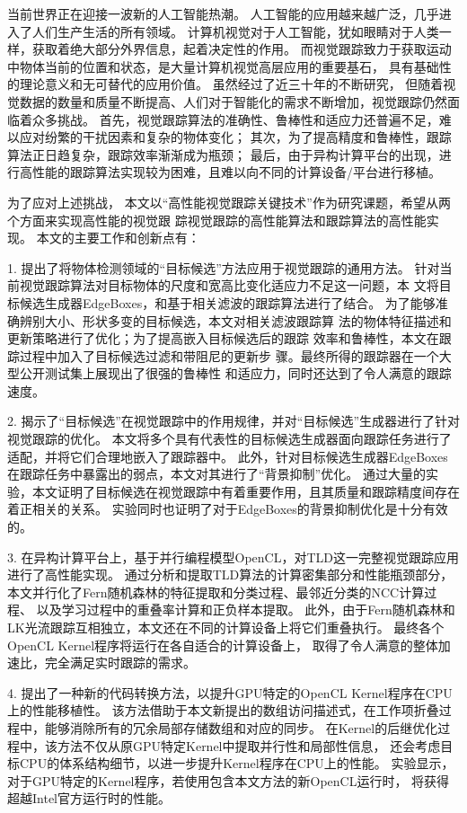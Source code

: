 \begin{cabstract}
当前世界正在迎接一波新的人工智能热潮。
人工智能的应用越来越广泛，几乎进入了人们生产生活的所有领域。
计算机视觉对于人工智能，犹如眼睛对于人类一样，获取着绝大部分外界信息，起着决定性的作用。
而视觉跟踪致力于获取运动中物体当前的位置和状态，是大量计算机视觉高层应用的重要基石，
具有基础性的理论意义和无可替代的应用价值。
虽然经过了近三十年的不断研究，
但随着视觉数据的数量和质量不断提高、人们对于智能化的需求不断增加，视觉跟踪仍然面临着众多挑战。
首先，视觉跟踪算法的准确性、鲁棒性和适应力还普遍不足，难以应对纷繁的干扰因素和复杂的物体变化；
其次，为了提高精度和鲁棒性，跟踪算法正日趋复杂，跟踪效率渐渐成为瓶颈；
最后，由于异构计算平台的出现，进行高性能的跟踪算法实现较为困难，且难以向不同的计算设备/平台进行移植。

为了应对上述挑战，
本文以``高性能视觉跟踪关键技术''作为研究课题，希望从两个方面来实现高性能的视觉跟
踪\pozhehao 视觉跟踪的高性能算法和跟踪算法的高性能实现。
本文的主要工作和创新点有：

1. 提出了将物体检测领域的``目标候选''方法应用于视觉跟踪的通用方法。
针对当前视觉跟踪算法对目标物体的尺度和宽高比变化适应力不足这一问题，本
文将目标候选生成器EdgeBoxes，和基于相关滤波的跟踪算法进行了结合。
为了能够准确辨别大小、形状多变的目标候选，本文对相关滤波跟踪算
法的物体特征描述和更新策略进行了优化；为了提高嵌入目标候选后的跟踪
效率和鲁棒性，本文在跟踪过程中加入了目标候选过滤和带阻尼的更新步
骤。最终所得的跟踪器在一个大型公开测试集上展现出了很强的鲁棒性
和适应力，同时还达到了令人满意的跟踪速度。

2. 揭示了``目标候选''在视觉跟踪中的作用规律，并对``目标候选''生成器进行了针对视觉跟踪的优化。
本文将多个具有代表性的目标候选生成器面向跟踪任务进行了适配，并将它们合理地嵌入了跟踪器中。
此外，针对目标候选生成器EdgeBoxes在跟踪任务中暴露出的弱点，本文对其进行了``背景抑制''优化。
通过大量的实验，本文证明了目标候选在视觉跟踪中有着重要作用，且其质量和跟踪精度间存在着正相关的关系。
实验同时也证明了对于EdgeBoxes的背景抑制优化是十分有效的。

3. 在异构计算平台上，基于并行编程模型OpenCL，对TLD这一完整视觉跟踪应用进行了高性能实现。
通过分析和提取TLD算法的计算密集部分和性能瓶颈部分，
本文并行化了Fern随机森林的特征提取和分类过程、最邻近分类的NCC计算过程、
以及学习过程中的重叠率计算和正负样本提取。
此外，由于Fern随机森林和LK光流跟踪互相独立，本文还在不同的计算设备上将它们重叠执行。
最终各个OpenCL Kernel程序将运行在各自适合的计算设备上，
取得了令人满意的整体加速比，完全满足实时跟踪的需求。

4. 提出了一种新的代码转换方法，以提升GPU特定的OpenCL Kernel程序在CPU上的性能移植性。
该方法借助于本文新提出的数组访问描述式，在工作项折叠过程中，能够消除所有的冗余局部存储数组和对应的同步。
在Kernel的后继优化过程中，该方法不仅从原GPU特定Kernel中提取并行性和局部性信息，
还会考虑目标CPU的体系结构细节，以进一步提升Kernel程序在CPU上的性能。
实验显示，对于GPU特定的Kernel程序，若使用包含本文方法的新OpenCL运行时，
将获得超越Intel官方运行时的性能。
\end{cabstract}

